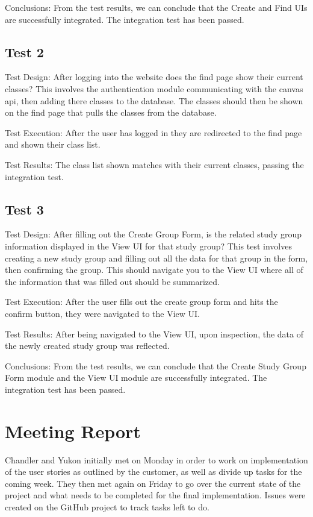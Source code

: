 \documentclass[12pt,letterpaper]{article}
\begin{document}
Conclusions: From the test results, we can conclude that the Create and Find UIs are successfully integrated. The integration test has been passed. 

\subsection{Test 2}
Test Design: After logging into the website does the find page show their current classes? This involves the authentication module communicating with the canvas api, then adding there classes to the database. The classes should then be shown on the find page that pulls the classes from the database.

Test Execution: After the user has logged in they are redirected to the find page and shown their class list.

Test Results: The class list shown matches with their current classes, passing the integration test.

\subsection{Test 3}
Test Design: After filling out the Create Group Form, is the related study group information displayed in the View UI for that study group? This test involves creating a new study group and filling out all the data for that group in the form, then confirming the group. This should navigate you to the View UI where all of the information that was filled out should be summarized.

Test Execution: After the user fills out the create group form and hits the confirm button, they were navigated to the View UI. 

Test Results: After being navigated to the View UI, upon inspection, the data of the newly created study group was reflected.

Conclusions: From the test results, we can conclude that the Create Study Group Form module and the View UI module are successfully integrated. The integration test has been passed.

\clearpage
\section{Meeting Report}
Chandler and Yukon initially met on Monday in order to work on implementation of the user stories as outlined by the customer, as well as divide up tasks for the coming week. They then met again on Friday to go over the current state of the project and what needs to be completed for the final implementation. Issues were created on the GitHub project to track tasks left to do.
\end{document}
